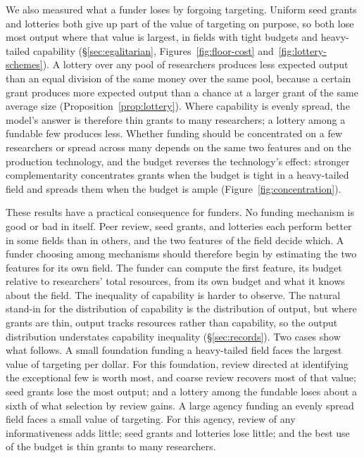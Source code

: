 \documentclass[article, 11pt, reqno]{amsart}
\theoremstyle{named}
\begin{document}
We also measured what a funder loses by forgoing targeting. Uniform seed grants and lotteries both give up part of the value of targeting on purpose, so both lose most output where that value is largest, in fields with tight budgets and heavy-tailed capability (\S\ref{sec:egalitarian}, Figures~\ref{fig:floor-cost} and~\ref{fig:lottery-schemes}). A lottery over any pool of researchers produces less expected output than an equal division of the same money over the same pool, because a certain grant produces more expected output than a chance at a larger grant of the same average size (Proposition~\ref{prop:lottery}). Where capability is evenly spread, the model's answer is therefore thin grants to many researchers; a lottery among a fundable few produces less. Whether funding should be concentrated on a few researchers or spread across many depends on the same two features and on the production technology, and the budget reverses the technology's effect: stronger complementarity concentrates grants when the budget is tight in a heavy-tailed field and spreads them when the budget is ample (Figure~\ref{fig:concentration}).

These results have a practical consequence for funders. No funding mechanism is good or bad in itself. Peer review, seed grants, and lotteries each perform better in some fields than in others, and the two features of the field decide which. A funder choosing among mechanisms should therefore begin by estimating the two features for its own field. The funder can compute the first feature, its budget relative to researchers' total resources, from its own budget and what it knows about the field. The inequality of capability is harder to observe. The natural stand-in for the distribution of capability is the distribution of output, but where grants are thin, output tracks resources rather than capability, so the output distribution understates capability inequality (\S\ref{sec:records}). Two cases show what follows. A small foundation funding a heavy-tailed field faces the largest value of targeting per dollar. For this foundation, review directed at identifying the exceptional few is worth most, and coarse review recovers most of that value; seed grants lose the most output; and a lottery among the fundable loses about a sixth of what selection by review gains. A large agency funding an evenly spread field faces a small value of targeting. For this agency, review of any informativeness adds little; seed grants and lotteries lose little; and the best use of the budget is thin grants to many researchers.
\end{document}
